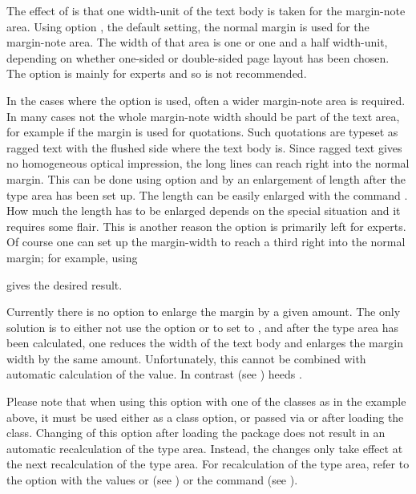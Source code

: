 The effect of  is that one width-unit of
the text body is taken for the margin-note area.  Using option
, the default setting, the normal
margin is used for the margin-note area.  The width of that area is
one or one and a half width-unit, depending on whether one-sided or
double-sided page layout has been chosen.  The option
 is mainly for experts and so is not recommended.
  
\begin{Explain}
  In the cases where the option  is used, often a
  wider margin-note area is required.  In many cases not the whole
  margin-note width should be part of the text area, for example if
  the margin is used for quotations.  Such quotations are typeset as
  ragged text with the flushed side where the text body is.  Since
  ragged text gives no homogeneous optical impression, the long lines
  can reach right into the normal margin.  This can be done using
  option  and by an enlargement of length
   after the type area has been set up.  The
  length can be easily enlarged with the command .
  How much the length has to be enlarged depends on the special
  situation and it requires some flair.  This is another reason the
   option is primarily left for experts.  Of course
  one can set up the margin-width to reach a third right into the
  normal margin; for example, using
\begin{lstcode}
  \setlength{\marginparwidth}{1.5\marginparwidth}
\end{lstcode}
  gives the desired result.

  Currently there is no option to enlarge the margin by a given
  amount.  The only solution is to either not use the option
   or to set  to ,
  and after the type area has been calculated, one reduces the
  width of the text body  and enlarges the margin
  width  by the same amount.  Unfortunately,
  this cannot be combined with automatic calculation of the
   value.  In contrast
   (see
  ) heeds
  .
\end{Explain}

Please note that when using this option with one of the {\KOMAScript}
classes as in the example above, it must be used either as a class
option, or passed via  or  after
loading the class. Changing of this option after loading the
 package does not result in an automatic
recalculation of the type area. Instead, the changes only take effect
at the next recalculation of the type area. For recalculation of the
type area, refer to the  option with the values
 or  (see
) or the
 command (see
).%
%
\EndIndexGroup


